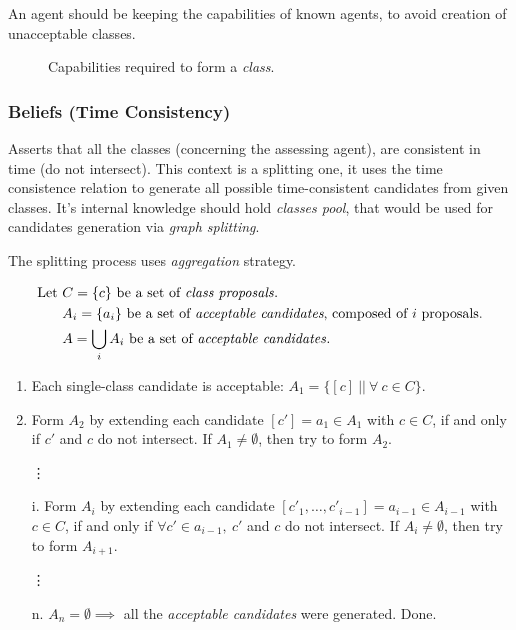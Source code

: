 An agent should be keeping the capabilities of known agents, to avoid creation
of unacceptable classes.

\begin{figure}[h]
  \centering
  
  \caption{Capabilities required to form a \emph{class}.}
  \label{fig:capabilities}
\end{figure}


\subsubsection{Beliefs (Time Consistency)}

Asserts that all the classes (concerning the assessing agent), are consistent in
time (do not intersect). This context is a splitting one, it uses the time
consistence relation to generate all possible time-consistent candidates from
given classes. It's internal knowledge should hold \emph{classes pool}, that
would be used for candidates generation via \emph{graph splitting}.

The splitting process uses \emph{aggregation} strategy.

\begin{align*}
  \mbox{Let } & C=\lbrace c \rbrace \text{ be a set of \emph{class proposals}}.\\
            ~ & A_i=\lbrace a_i \rbrace \text{ be a set of \emph{acceptable candidates},
                                         composed of } i \text{ proposals.}\\
            ~ & A=\bigcup\limits_{i} A_i \text{ be a set of \emph{acceptable candidates}}.
\end{align*}

\begin{enumerate}
  \item Each single-class candidate is acceptable:
    $A_1 = \lbrace [ c ] ~||~ \forall ~ c \in C \rbrace$.
  \item Form $A_2$ by extending each candidate $[c'] = a_1 \in A_1$ with $c \in C$,
    if and only if $c'$ and $c$ do not intersect. If $A_1 \not= \emptyset$,
    then try to form $A_2$.
  \item[\vdots]
  \item[i.] Form $A_i$ by extending each candidate $[c'_1, \dots, c'_{i-1}] = a_{i-1}
    \in A_{i-1}$ with $c \in C$, if and only if $\forall c' \in a_{i-1}, ~c'$
    and $c$ do not intersect. If $A_i \not= \emptyset$, then try to form $A_{i+1}$.
   \item[\vdots]
   \item[n.] $A_n = \emptyset \implies$ all the \emph{acceptable candidates}
     were generated. Done.
\end{enumerate}


